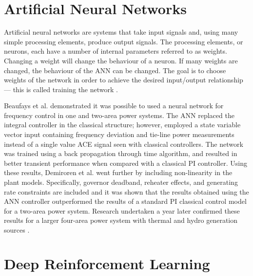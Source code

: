 \section{Artificial Neural Networks}
Artificial neural networks are systems that take input signals and, using many simple processing elements, produce output signals. The processing elements, or neurons, each have a number of internal parameters referred to as weights. Changing a weight will change the behaviour of a neuron. If many weights are changed, the behaviour of the ANN can be changed. The goal is to choose weights of the network in order to achieve the desired input/output relationship --- this is called training the network \cite{Nguyen1990}.

Beaufays et al. \cite{Beaufays1994} demonstrated it was possible to used a neural network for frequency control in one and two-area power systems. The ANN replaced the integral controller in the classical structure; however, employed a state variable vector input containing frequency deviation and tie-line power measurements instead of a single value ACE signal seen with classical controllers. The network was trained using a back propagation through time algorithm, and resulted in better transient performance when compared with a classical PI controller. Using these results, Demiroren et al. \cite{Demiroren2001} went further by including non-linearity in the plant models. Specifically, governor deadband, reheater effects, and generating rate constraints are included and it was shown that the results obtained using the ANN controller outperformed the results of a standard PI classical control model for a two-area power system. Research undertaken a year later confirmed these results for a larger four-area power system with thermal and hydro generation sources \cite{Zeynelgil2002}.


\section{Deep Reinforcement Learning}
